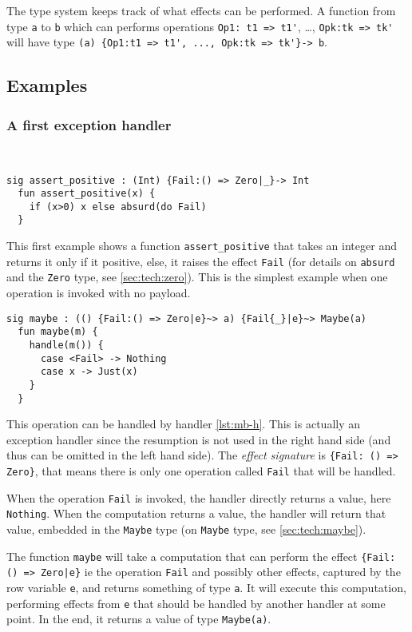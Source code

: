 \documentclass[nonacm=true, language=french, language=english]{acmart}
\begin{document}
The type system keeps track of what effects can be performed. A function from type \verb|a| to \verb|b| which can performs operations \verb|Op1: t1 => t1'|, \dots, \verb|Opk:tk => tk'| will have type \verb+(a) {Op1:t1 => t1', ..., Opk:tk => tk'}-> b+.


\subsection{Examples}

\subsubsection{A first exception handler}
\label{sec:first-except-handl}

~

\begin{lstlisting}[caption=Fail invocation]
  sig assert_positive : (Int) {Fail:() => Zero|_}-> Int
  fun assert_positive(x) {
    if (x>0) x else absurd(do Fail)
  }
\end{lstlisting}

This first example shows a function \verb|assert_positive| that takes an integer and returns it only if it positive, else, it raises the effect \verb|Fail| (for details on \verb|absurd| and the \verb|Zero| type, see \ref{sec:tech:zero}). This is the simplest example when one operation is invoked with no payload.

\begin{lstlisting}[caption=maybe handler, label=lst:mb-h]
  sig maybe : (() {Fail:() => Zero|e}~> a) {Fail{_}|e}~> Maybe(a)
  fun maybe(m) {
    handle(m()) {
      case <Fail> -> Nothing
      case x -> Just(x)
    }
  }
\end{lstlisting}

This operation can be handled by handler \ref{lst:mb-h}. This is actually an exception handler since the resumption is not used in the right hand side (and thus can be omitted in the left hand side). The \emph{effect signature} is \verb|{Fail: () => Zero}|, that means there is only one operation called \verb|Fail| that will be handled.

When the operation \verb|Fail| is invoked, the handler directly returns a value, here \verb|Nothing|. When the computation returns a value, the handler will return that value, embedded in the \verb|Maybe| type (on \verb|Maybe| type, see \ref{sec:tech:maybe}).

The function \verb|maybe| will take a computation that can perform the effect \verb+{Fail: () => Zero|e}+ ie the operation \verb|Fail| and possibly other effects, captured by the row variable \verb|e|, and returns something of type \verb|a|. It will execute this computation, performing effects from \verb|e| that should be handled by another handler at some point. In the end, it returns a value of type \verb|Maybe(a)|.
\end{document}
